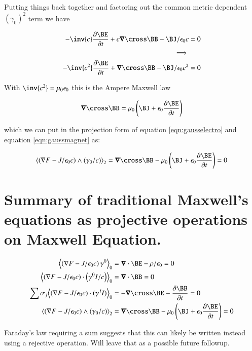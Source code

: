 \documentclass{article}      %
\newcommand{\gpgrade}[2] {{\left\langle{{#1}}\right\rangle}_{#2}}
\newcommand{\gpgradezero}[1] {\gpgrade{#1}{0}}
\newcommand{\gpgradetwo}[1] {\gpgrade{#1}{2}}
\newcommand{\grad}[0]{\nabla}
\newcommand{\spacegrad}[0]{\boldsymbol{\nabla}}
\newcommand{\PD}[2]{\frac{\partial {#2}}{\partial {#1}}}
\begin{document}
Putting things back together and factoring out the common metric dependent $(\gamma_0)^2$ term we have

\begin{align*}
- \inv{c} \PD{t}{\BE} + c \spacegrad \cross \BB - \BJ/\epsilon_0 c &= 0 \\
\implies \\
- \inv{c^2} \PD{t}{\BE} + \spacegrad \cross \BB - \BJ/\epsilon_0 c^2 &= 0
\end{align*}

With $\inv{c^2} = \mu_0 \epsilon_0$ this is the Ampere Maxwell law

\begin{equation}
\spacegrad \cross \BB = \mu_0 \left(\BJ + \epsilon_0 \PD{t}{\BE} \right)
\end{equation}

which we can put in the projection form of equation \ref{eqn:gausselectro} and equation \ref{eqn:gaussmagnet} as:

\begin{equation}\label{eqn:amperemaxwell}
\gpgradetwo{\left(\grad F - J/\epsilon_0 c\right) \wedge (\gamma_0/c)} =
\spacegrad \cross \BB - \mu_0 \left(\BJ + \epsilon_0 \PD{t}{\BE} \right) = 0
\end{equation}

\section{Summary of traditional Maxwell's equations as projective operations on Maxwell Equation. }

\begin{align}
\gpgradezero{\left(\grad F - J/\epsilon_0 c\right) \gamma^0} &= \spacegrad \cdot \BE - \rho/\epsilon_0 = 0 \\
\gpgradezero{\left(\grad F - J/\epsilon_0 c\right) \cdot \left(\gamma^0 I / c \right)} &= \spacegrad \cdot \BB = 0 \\
\sum \sigma_j \gpgradezero{( \grad F - J/\epsilon_0 c ) \cdot (\gamma^j I)} &= -\spacegrad \cross \BE - \PD{t}{\BB} = 0 \\
\gpgradetwo{\left(\grad F - J/\epsilon_0 c\right) \wedge (\gamma_0/c)} &= \spacegrad \cross \BB - \mu_0 \left(\BJ + \epsilon_0 \PD{t}{\BE} \right) = 0
\end{align}

Faraday's law requiring a sum suggests that this can likely be written instead using a rejective operation.  Will leave that as a possible future followup.
\end{document}
